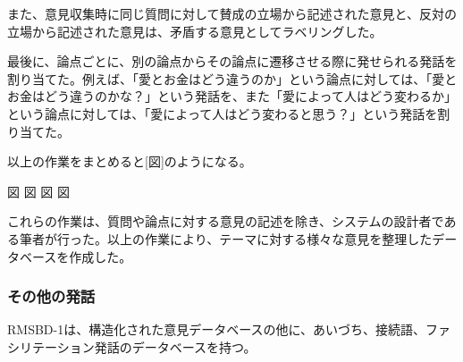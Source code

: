 \documentclass[11pt, a4paper]{jreport} %
\begin{document}
\begin{enumerate}
また、意見収集時に同じ質問に対して賛成の立場から記述された意見と、反対の立場から記述された意見は、矛盾する意見としてラベリングした。%


最後に、論点ごとに、別の論点からその論点に遷移させる際に発せられる発話を割り当てた。例えば、「愛とお金はどう違うのか」という論点に対しては、「愛とお金はどう違うのかな？」という発話を、また「愛によって人はどう変わるか」という論点に対しては、「愛によって人はどう変わると思う？」という発話を割り当てた。


以上の作業をまとめると[図]のようになる。

図
図
図
図


これらの作業は、質問や論点に対する意見の記述を除き、システムの設計者である筆者が行った。以上の作業により、テーマに対する様々な意見を整理したデータベースを作成した。
\end{enumerate}
\subsubsection*{その他の発話}
RMSBD-1は、構造化された意見データベースの他に、あいづち、接続語、ファシリテーション発話のデータベースを持つ。
\end{document}
